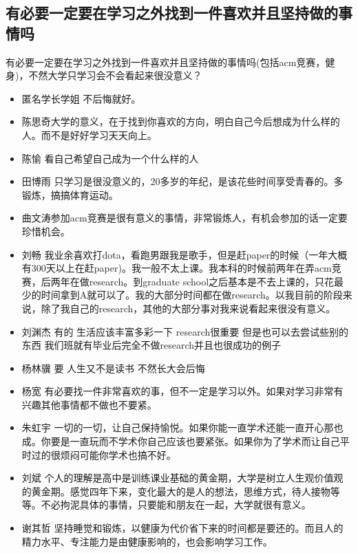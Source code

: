 \documentclass{vivid_layout}
\begin{document}
\subsection{有必要一定要在学习之外找到一件喜欢并且坚持做的事情吗}
有必要一定要在学习之外找到一件喜欢并且坚持做的事情吗(包括acm竞赛，健身)，不然大学只学习会不会看起来很没意义？
\begin{itemize}
\item {\name 匿名学长学姐}  \quad 不后悔就好。
\item { 陈思奇}\quad 大学的意义，在于找到你喜欢的方向，明白自己今后想成为什么样的人。而不是好好学习天天向上。
\item { 陈愉}  \quad 看自己希望自己成为一个什么样的人
\item  { 田博雨}  \quad 只学习是很没意义的，20多岁的年纪，是该花些时间享受青春的。多锻炼，搞搞体育运动。
\item { 曲文涛}\quad 参加acm竞赛是很有意义的事情，非常锻炼人，有机会参加的话一定要珍惜机会。
\item  { 刘畅}  \quad 我业余喜欢打dota，看跑男跟我是歌手，但是赶paper的时候（一年大概有300天以上在赶paper)。我一般不太上课。我本科的时候前两年在弄acm竞赛，后两年在做research。到graduate school之后基本是不去上课的，只花最少的时间拿到A就可以了。我的大部分时间都在做research。以我目前的阶段来说，除了我自己的research，其他的大部分事对我来说看起来很没有意义。
\item  { 刘渊杰}  \quad 有的 生活应该丰富多彩一下 research很重要 但是也可以去尝试些别的东西 我们班就有毕业后完全不做research并且也很成功的例子
\item  { 杨林骥}  \quad 要 人生又不是读书 不然长大会后悔
\item  { 杨宽}  \quad 有必要找一件非常喜欢的事，但不一定是学习以外。如果对学习非常有兴趣其他事情都不做也不要紧。
\item  { 朱虹宇}  \quad 一切的一切，让自己保持愉悦。如果你能一直学术还能一直开心那也成。你要是一直玩而不学术你自己应该也要紧张。如果你为了学术而让自己平时过的很烦闷可能你学术也搞不好。
\item  { 刘斌}  \quad 个人的理解是高中是训练课业基础的黄金期，大学是树立人生观价值观的黄金期。感觉四年下来，变化最大的是人的想法，思维方式，待人接物等等。不必拘泥具体的事情，只要能和朋友在一起，大学就很有意义。
\item  { 谢其哲}  \quad 坚持睡觉和锻炼，以健康为代价省下来的时间都是要还的。而且人的精力水平、专注能力是由健康影响的，也会影响学习工作。
\end{itemize}
\end{document}
